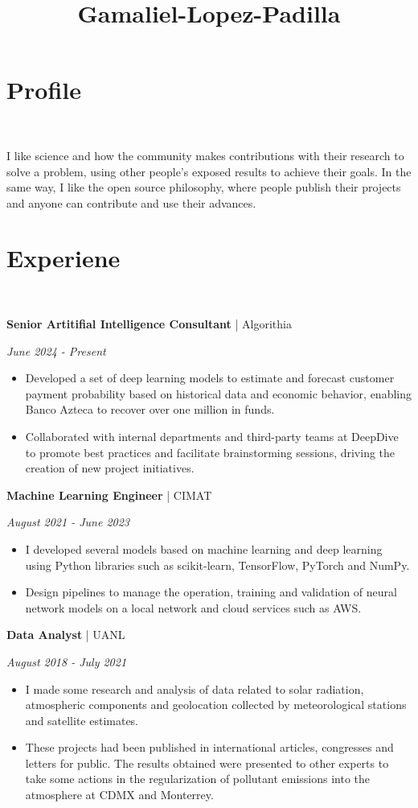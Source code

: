 \documentclass[a3paper]{adcv_color}
\title{Gamaliel-Lopez-Padilla}
\newcommand{\work}[3]{
	\begin{minipage}{0.75\linewidth}
		\textbf{#1} | #2
	\end{minipage}
	\begin{minipage}{0.25\linewidth}
		\begin{flushright}
			\textit{#3}
		\end{flushright}
	\end{minipage}
	\vspace{-1cm}
}
\begin{document}
\changefontsizes{14pt}
\section{Profile}\\
\begin{addmargin}[0.5em]{0.2em}
	\begin{flushleft}
		I like science and how the community makes contributions with their research to solve a problem, using other people's exposed results to achieve their goals. In the same way, I like the open source philosophy, where people publish their projects and anyone can contribute and use their advances.
	\end{flushleft}
\end{addmargin}
\section{Experiene}\\
\begin{addmargin}[0.5em]{0.5em}
	\work{Senior Artitifial Intelligence Consultant}{Algorithia}{June 2024 - Present}
	\begin{itemize}
		\item Developed a set of deep learning models to estimate and forecast customer payment probability based on historical data and economic behavior, enabling Banco Azteca to recover over one million in funds.
		\item Collaborated with internal departments and third-party teams at DeepDive to promote best practices and facilitate brainstorming sessions, driving the creation of new project initiatives.
	\end{itemize}
	\work{Machine Learning Engineer}{CIMAT}{August 2021 - June 2023}
	\begin{itemize}
		\item  I developed several models based on machine learning and deep learning using Python libraries such as scikit-learn, TensorFlow, PyTorch and NumPy.
		\item Design pipelines to manage the operation, training and validation of neural network models on a local network and cloud services such as AWS.
	\end{itemize}
	\work{Data Analyst}{UANL}{August 2018 - July 2021}
	\begin{itemize}
		\item I made some research and analysis of data related to solar radiation, atmospheric components and geolocation collected by meteorological stations and satellite estimates.
		\item These projects had been published in international articles, congresses and letters for public. The results obtained were presented to other experts to take some actions in the regularization of pollutant emissions into the atmosphere at CDMX and Monterrey.
	\end{itemize}
\end{addmargin}
\end{document}
